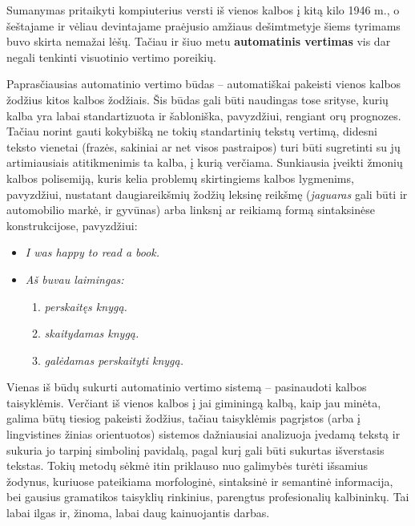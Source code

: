 \begin{multicols}{2}
 Sumanymas pritaikyti kompiuterius versti iš vienos kalbos į kitą kilo 1946 m., o šeštajame ir vėliau devintajame praėjusio amžiaus dešimtmetyje šiems tyrimams buvo skirta nemažai lėšų. Tačiau ir šiuo metu \textbf{automatinis vertimas} vis dar negali tenkinti visuotinio vertimo poreikių.

Paprasčiausias automatinio vertimo būdas – automatiškai pakeisti vienos kalbos žodžius kitos kalbos žodžiais. Šis būdas gali būti naudingas tose srityse, kurių kalba yra labai standartizuota ir šabloniška, pavyzdžiui, rengiant orų prognozes. Tačiau norint gauti kokybišką ne tokių standartinių tekstų vertimą, didesni teksto vienetai (frazės, sakiniai ar net visos pastraipos) turi būti sugretinti su jų artimiausiais atitikmenimis ta kalba, į kurią verčiama. Sunkiausia įveikti žmonių kalbos polisemiją, kuris kelia problemų skirtingiems kalbos lygmenims, pavyzdžiui, nustatant daugiareikšmių žodžių leksinę reikšmę (\textit{jaguaras} gali būti ir automobilio markė, ir gyvūnas) arba linksnį ar reikiamą formą sintaksinėse konstrukcijose, pavyzdžiui:

\begin{itemize}
\item \textit{I was happy to read a book.}
\item \textit{Aš buvau laimingas:}
  \begin{enumerate}
  \item \textit{perskaitęs knygą.}
  \item \textit{skaitydamas knygą.}
  \item \textit{galėdamas perskaityti knygą.}
  \end{enumerate}
\end{itemize}

Vienas iš būdų sukurti automatinio vertimo sistemą – pasinaudoti kalbos taisyklėmis. Verčiant iš vienos kalbos į jai giminingą kalbą, kaip jau minėta, galima būtų tiesiog pakeisti žodžius, tačiau taisyklėmis pagrįstos (arba į lingvistines žinias orientuotos) sistemos dažniausiai analizuoja įvedamą tekstą ir sukuria jo tarpinį simbolinį pavidalą, pagal kurį gali būti sukurtas išverstasis tekstas. Tokių metodų sėkmė itin priklauso nuo galimybės turėti išsamius žodynus, kuriuose pateikiama morfologinė, sintaksinė ir semantinė informacija, bei gausius gramatikos taisyklių rinkinius, parengtus profesionalių kalbininkų. Tai labai ilgas ir, žinoma, labai daug kainuojantis darbas.



\end{multicols}
